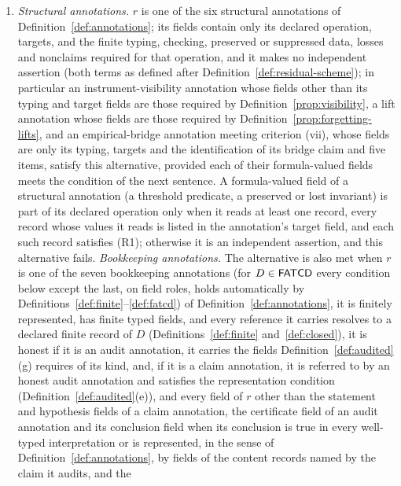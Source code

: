 \begin{definition}
\begin{enumerate}[label=(R\arabic*),topsep=2pt,itemsep=1pt]
    some \(P_i\), and each of its predicate, comparison, invariant, law or claim
    fields is an input to the recorded check of \(W_i\) on that cluster; merely
    referencing a witness cluster does not suffice;
  \item \emph{Structural annotations.} \(r\) is one of the six structural annotations of
    Definition~\ref{def:annotations}; its fields contain only its declared
    operation, targets, and the finite typing, checking, preserved or
    suppressed data, losses and nonclaims required for that operation, and it
    makes no independent assertion (both terms as defined after
    Definition~\ref{def:residual-scheme}); in particular an instrument-visibility
    annotation whose fields other than its typing and target fields are those
    required by Definition~\ref{prop:visibility}, a lift annotation whose fields are those
    required by Definition~\ref{prop:forgetting-lifts}, and an
    empirical-bridge annotation meeting criterion (vii), whose fields are only
    its typing, targets and the identification of its bridge claim and five
    items, satisfy this
    alternative, provided each of their formula-valued fields meets the
    condition of the next sentence. A formula-valued field of a structural annotation (a threshold predicate, a preserved or lost invariant) is part of its declared operation only when it reads at least one record, every record whose values it reads is listed in the annotation's target field, and each such record satisfies (R1); otherwise it is an independent assertion, and this alternative fails.
    \emph{Bookkeeping annotations.} The alternative is also met when \(r\) is one of the seven bookkeeping annotations (for \(D\in\mathsf{FATCD}{}\) every condition below except the last, on field roles, holds automatically by Definitions~\ref{def:finite}--\ref{def:fatcd}) of
    Definition~\ref{def:annotations}, it is finitely represented, has finite typed fields, and every reference it carries resolves to a declared finite record of \(D\) (Definitions~\ref{def:finite} and~\ref{def:closed}), it is honest if it is an audit annotation, it carries the fields Definition~\ref{def:audited}(g) requires of its kind, and, if it is a claim annotation, it is referred to by an honest audit annotation and satisfies the representation condition (Definition~\ref{def:audited}(e)), and every field of
    \(r\) other than the statement and hypothesis fields of a claim annotation,
    the certificate field of an audit annotation and its conclusion field when its conclusion is true in every well-typed interpretation or is represented, in the sense of Definition~\ref{def:annotations}, by fields of the content records named by the claim it audits, and the

\end{enumerate}
\end{definition}
